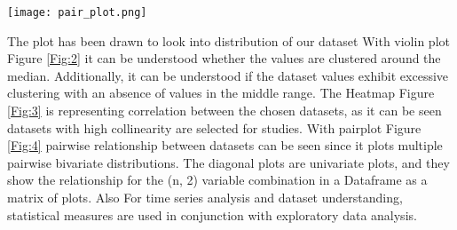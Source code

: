    \begin{figure*}[h!]
    \centering
     \texttt{[image: pair\_plot.png]}
     \caption{Patient's dataset distribution pair-plot}
    \label{Fig:4}
   \end{figure*}
  

 
 The plot has been drawn to look into distribution of our dataset With violin plot Figure  \ref{Fig:2} it can be understood whether the values are clustered around the median. Additionally,  it can be understood if the dataset values exhibit excessive clustering with an absence of values in the middle range. The Heatmap Figure  \ref{Fig:3} is representing correlation between the chosen datasets,  as it can be seen datasets with high collinearity are selected for studies. With pairplot Figure  \ref{Fig:4} pairwise relationship between datasets can be seen since it plots multiple pairwise bivariate distributions. The diagonal plots are univariate plots, and they show the relationship for the (n,  2) variable combination in a Dataframe as a matrix of plots.
Also  For time series analysis and dataset understanding,  statistical measures are used in conjunction with exploratory data analysis.
 


